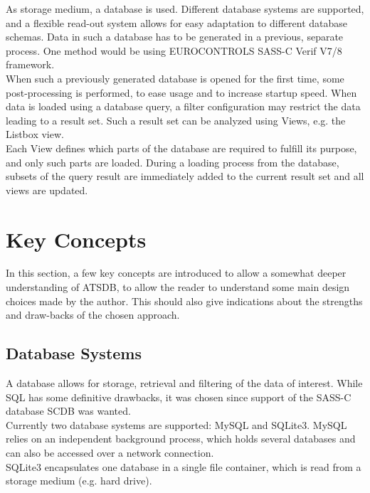 \documentclass[10pt,letterpaper,extrafontsizes]{memoir}
\begin{document}
As storage medium, a database is used.  Different database systems are supported, and a flexible read-out system allows for easy adaptation to different database schemas.  Data in such a database has to be generated in a previous, separate process.  One method would be using EUROCONTROLS SASS-C  Verif V7/8 framework.\\

When such a previously generated database is opened for the first time, some post-processing is performed, to ease usage and to increase startup speed.  When data is loaded using a database query, a filter configuration may restrict the data leading to a result set.  Such a result set can be analyzed using Views, e.g. the Listbox view.\\

Each View defines which parts of the database are required to fulfill its purpose, and only such parts are loaded.  During a loading process from the database, subsets of the query result are immediately added to the current result set and all views are updated.

\chapter{Key Concepts}
\label{cha:key_concepts}

In this section, a few key concepts are introduced to allow a somewhat deeper understanding of ATSDB, to allow the reader to understand some main design choices made by the author. This should also give indications about the strengths and draw-backs of the chosen approach.

\section*{Database Systems}
A database allows for storage, retrieval and filtering of the data of interest. While SQL has some definitive drawbacks, it was chosen since support of the SASS-C database SCDB was wanted.\\
Currently  two  database  systems  are  supported:  MySQL  and  SQLite3.   MySQL  relies  on  an  independent background process, which holds several databases and can also be accessed over a network connection.\\
SQLite3 encapsulates one database in a single file container, which is read from a storage medium (e.g. hard drive).
\end{document}
